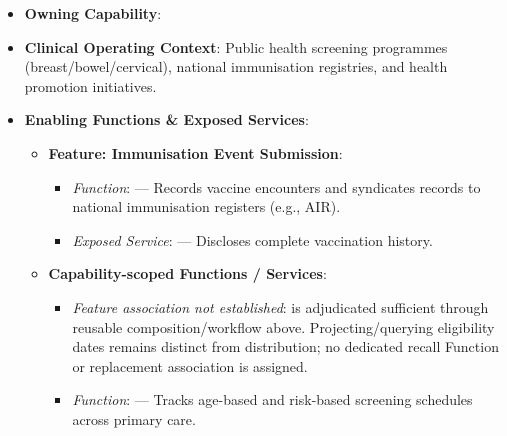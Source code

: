 \begin{itemize}

\item 
\textbf{Owning Capability}: \texttt{}



\item 
\textbf{Clinical Operating Context}: Public health screening programmes (breast/\allowbreak{}bowel/\allowbreak{}cervical), national immunisation registries, and health promotion initiatives.



\item 
\textbf{Enabling Functions \& Exposed Services}:


\begin{itemize}

\item 
\textbf{Feature: Immunisation Event Submission}:


\begin{itemize}

\item 
\emph{Function}: \texttt{} — Records vaccine encounters and syndicates records to national immunisation registers (e.g., AIR).



\item 
\emph{Exposed Service}: \texttt{} — Discloses complete vaccination history.



\end{itemize}


\item 
\textbf{Capability-scoped Functions /\allowbreak{} Services}:


\begin{itemize}

\item 
\emph{Feature association not established}: \texttt{} is adjudicated sufficient through reusable composition/\allowbreak{}workflow above. Projecting/\allowbreak{}querying eligibility dates remains distinct from distribution; no dedicated recall Function or replacement association is assigned.



\item 
\emph{Function}: \texttt{} — Tracks age-based and risk-based screening schedules across primary care.




\end{itemize}
\end{itemize}
\end{itemize}
